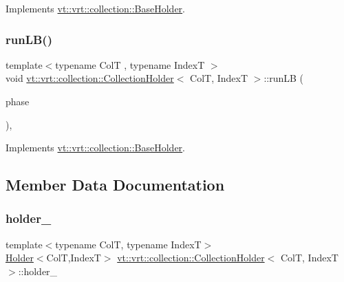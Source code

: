 Implements \hyperlink{structvt_1_1vrt_1_1collection_1_1_base_holder_a56c8289f60121e38f3699bcfafbbd491}{vt\+::vrt\+::collection\+::\+Base\+Holder}.

\mbox{\label{structvt_1_1vrt_1_1collection_1_1_collection_holder_a09a3f3e6ec221f36f3417713e64e8f69}} 
\subsubsection{\texorpdfstring{run\+L\+B()}{runLB()}}
{\footnotesize\ttfamily template$<$typename ColT , typename IndexT $>$ \\
void \hyperlink{structvt_1_1vrt_1_1collection_1_1_collection_holder}{vt\+::vrt\+::collection\+::\+Collection\+Holder}$<$ ColT, IndexT $>$\+::run\+LB (\begin{DoxyParamCaption}\item[{\hyperlink{namespacevt_a46ce6733d5cdbd735d561b7b4029f6d7}{Phase\+Type}}]{phase }\end{DoxyParamCaption})\hspace{0.3cm}{\ttfamily [override]}, {\ttfamily [virtual]}}



Implements \hyperlink{structvt_1_1vrt_1_1collection_1_1_base_holder_ab9f7a730ced86b24d75b3f33ea3db3e8}{vt\+::vrt\+::collection\+::\+Base\+Holder}.



\subsection{Member Data Documentation}
\mbox{\label{structvt_1_1vrt_1_1collection_1_1_collection_holder_ae553cc92f33cac4493cafd32b4350743}} 
\subsubsection{\texorpdfstring{holder\+\_\+}{holder\_}}
{\footnotesize\ttfamily template$<$typename ColT, typename IndexT$>$ \\
\hyperlink{structvt_1_1vrt_1_1collection_1_1_holder}{Holder}$<$ColT,IndexT$>$ \hyperlink{structvt_1_1vrt_1_1collection_1_1_collection_holder}{vt\+::vrt\+::collection\+::\+Collection\+Holder}$<$ ColT, IndexT $>$\+::holder\+\_\+}

